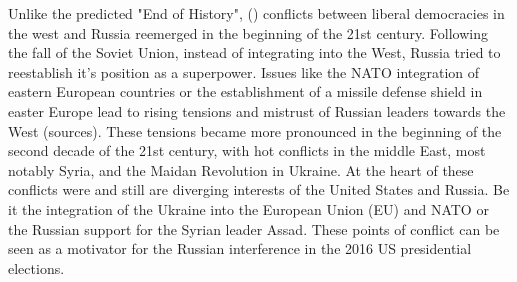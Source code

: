\documentclass[12pt, authoryear]{elsarticle}
\begin{document}
Unlike the predicted "End of History", (\cite{fukuyama1989end}) conflicts between liberal democracies in the west and Russia reemerged in the beginning of the 21st century. Following the fall of the Soviet Union, instead of integrating into the West, Russia tried to reestablish it's position as a superpower. Issues like the NATO integration of eastern European countries or the establishment of a missile defense shield in easter Europe lead to rising tensions and mistrust of Russian leaders towards the West (sources). These tensions became more pronounced in the beginning of the second decade of the 21st century, with hot conflicts in the middle East, most notably Syria, and the Maidan Revolution in Ukraine. At the heart of these conflicts were and still are diverging interests of the United States and Russia. Be it the integration of the Ukraine into the European Union (EU) and NATO or the Russian support for the Syrian leader Assad. These points of conflict can be seen as a motivator for the Russian interference in the 2016 US presidential elections.
\end{document}
